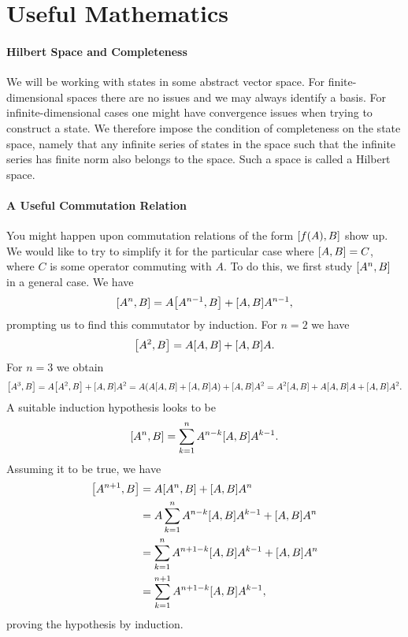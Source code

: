 \section{Useful Mathematics}

\paragraph{Hilbert Space and Completeness} We will be working with states in some abstract vector space. For finite-dimensional spaces there are no issues and we may always identify a basis. For infinite-dimensional cases one might have convergence issues when trying to construct a state. We therefore impose the condition of completeness on the state space, namely that any infinite series of states in the space such that the infinite series has finite norm also belongs to the space. Such a space is called a Hilbert space.

\paragraph{A Useful Commutation Relation}
You might happen upon commutation relations of the form $\comm{f(A)}{B}$ show up. We would like to try to simplify it for the particular case where $\comm{A}{B} = C$, where $C$ is some operator commuting with $A$. To do this, we first study $\comm{A^{n}}{B}$ in a general case. We have
\begin{align*}
	\comm{A^{n}}{B} = A\comm{A^{n - 1}}{B} + \comm{A}{B}A^{n - 1},
\end{align*}
prompting us to find this commutator by induction. For $n = 2$ we have
\begin{align*}
	\comm{A^{2}}{B} = A\comm{A}{B} + \comm{A}{B}A.
\end{align*}
For $n = 3$ we obtain
\begin{align*}
	\comm{A^{3}}{B} = A\comm{A^{2}}{B} + \comm{A}{B}A^{2} = A(A\comm{A}{B} + \comm{A}{B}A) + \comm{A}{B}A^{2} = A^{2}\comm{A}{B} + A\comm{A}{B}A + \comm{A}{B}A^{2}.
\end{align*}
A suitable induction hypothesis looks to be
\begin{align*}
	\comm{A^{n}}{B} = \sum\limits_{k = 1}^{n}A^{n - k}\comm{A}{B}A^{k - 1}.
\end{align*}
Assuming it to be true, we have
\begin{align*}
	\comm{A^{n + 1}}{B} &= A\comm{A^{n}}{B} + \comm{A}{B}A^{n} \\
	                    &= A\sum\limits_{k = 1}^{n}A^{n - k}\comm{A}{B}A^{k - 1} + \comm{A}{B}A^{n} \\
	                    &= \sum\limits_{k = 1}^{n}A^{n + 1 - k}\comm{A}{B}A^{k - 1} + \comm{A}{B}A^{n} \\
	                    &= \sum\limits_{k = 1}^{n + 1}A^{n + 1 - k}\comm{A}{B}A^{k - 1},
\end{align*}
proving the hypothesis by induction.

